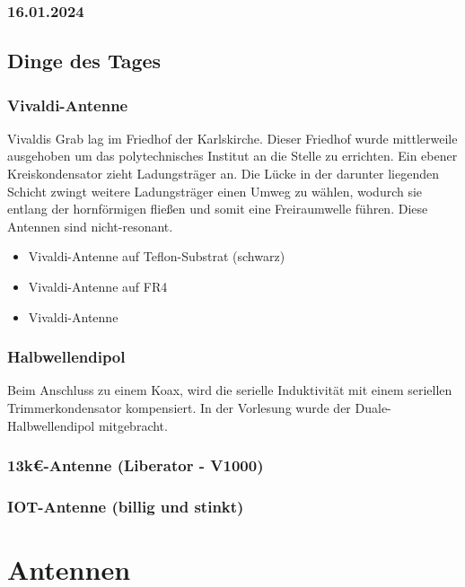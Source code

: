 \documentclass[a4paper]{article}
\begin{document}
\subsubsection*{16.01.2024}
\subsection*{Dinge des Tages}
\subsubsection*{Vivaldi-Antenne}
Vivaldis Grab lag im Friedhof der Karlskirche. Dieser Friedhof wurde mittlerweile
ausgehoben um das polytechnisches Institut an die Stelle zu errichten.
Ein ebener Kreiskondensator zieht Ladungsträger an. Die Lücke in der darunter liegenden
Schicht zwingt weitere Ladungsträger einen Umweg zu wählen, wodurch sie entlang
der hornförmigen fließen und somit eine Freiraumwelle führen. \newline
Diese Antennen sind nicht-resonant.
\begin{itemize}
    \item Vivaldi-Antenne auf Teflon-Substrat (schwarz)
    \item Vivaldi-Antenne auf FR4
    \item Vivaldi-Antenne
\end{itemize}

\subsubsection*{Halbwellendipol}
Beim Anschluss zu einem Koax, wird die serielle Induktivität mit einem seriellen
Trimmerkondensator kompensiert.\newline
In der Vorlesung wurde der Duale-Halbwellendipol mitgebracht.

\subsubsection*{13k€-Antenne (Liberator - V1000)}

\subsubsection*{IOT-Antenne (billig und stinkt)}


\section*{Antennen}
\end{document}
